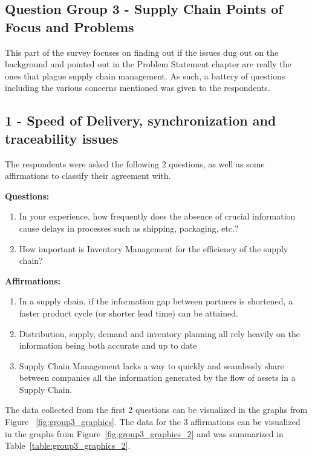 \subsection{Question Group 3 - Supply Chain Points of Focus and Problems}
\label{sec-supplychainissues}
This part of the survey focuses on finding out if the issues dug out on the background and pointed out in the Problem Statement chapter are really the ones that plague supply chain management. As such, a battery of questions including the various concerns mentioned was given to the respondents.

\subsection*{1 - Speed of Delivery, synchronization and traceability issues}

The respondents were asked the following 2 questions, as well as some affirmations to classify their agreement with.

\par\textbf{Questions:}
\begin{enumerate}
  \item In your experience, how frequently does the absence of crucial information cause delays in processes such as shipping, packaging, etc.?
  \item How important is Inventory Management for the efficiency of the supply chain?
\end{enumerate}

\par\textbf{Affirmations:}
\begin{enumerate}

\item In a supply chain, if the information gap between partners is shortened, a faster product cycle (or shorter lead time) can be attained.
\item Distribution, supply, demand and inventory planning all rely heavily on the information being both accurate and up to date

\item Supply Chain Management lacks a way to quickly and seamlessly share between companies all the information generated by the flow of assets in a Supply Chain.
\end{enumerate}

The data collected from the first 2 questions can be visualized in the graphs from Figure ~\ref{fig:group3_graphics}. The data for the 3 affirmations can be visualized in the graphs from Figure~\ref{fig:group3_graphics_2} and was summarized in Table~\ref{table:group3_graphics_2}.


